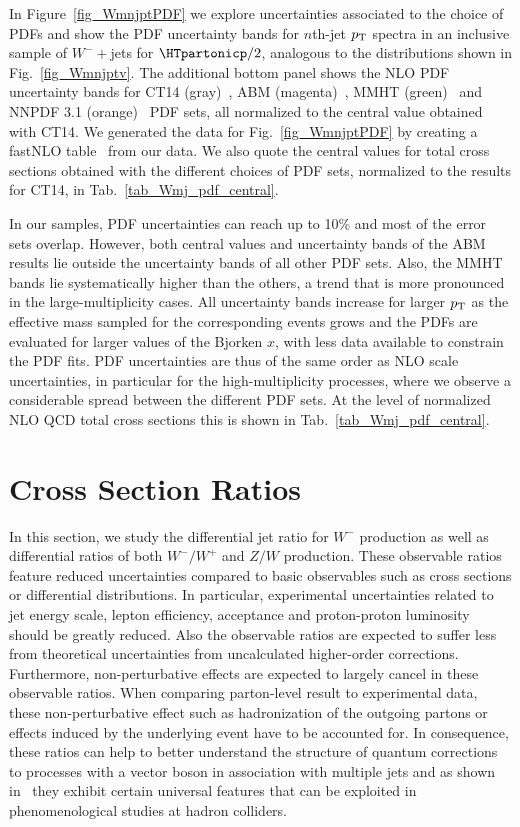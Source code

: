 In Figure~\ref{fig_WmnjptPDF} we explore uncertainties associated to
the choice of PDFs and show the PDF uncertainty bands for $n$th-jet $p_{\textrm T}$ spectra
in an inclusive sample of $W^-+$jets for $\HTpartonicp/2$, analogous to the distributions shown in
Fig.~\ref{fig_Wmnjptv}. The additional bottom panel shows the NLO PDF uncertainty
bands for CT14 (gray)~\cite{CT14}, ABM (magenta)~\cite{ABM}, MMHT
(green)~\cite{MMHT} and
NNPDF 3.1 (orange)~\cite{NNPDF} PDF
sets, all normalized to the central value obtained with CT14. 
We generated the data for Fig.~\ref{fig_WmnjptPDF} by
creating a fastNLO table~\cite{Britzger:2012bs} from our \ntuple{} data. We also quote the
central values for total cross sections obtained with the different
choices of PDF sets, normalized to the results for CT14, in Tab.~\ref{tab_Wmj_pdf_central}.


In our samples, PDF uncertainties can reach up to 10\% and most of the error sets
overlap. However, both central values and uncertainty bands of the ABM
results lie outside the uncertainty bands of all other PDF sets. Also, the MMHT bands
lie systematically higher than the others, a trend that is more pronounced in the
large-multiplicity cases. All uncertainty bands increase for larger
$p_{\textrm T}$ as the effective mass sampled for the corresponding
events grows and the PDFs are evaluated for larger values of the Bjorken $x$, with less data available to constrain the PDF
fits. PDF uncertainties are thus of the same order as NLO scale
uncertainties, in particular for the high-multiplicity processes,
where we observe a considerable spread between the different PDF sets. At the
level of normalized NLO QCD total cross sections this is shown in
Tab.~\ref{tab_Wmj_pdf_central}.


\section{Cross Section Ratios}
\label{sec_ratios}

In this
section, we study the differential jet ratio for $W^-$ production as
well as differential ratios of both $W^-/W^+$ and $Z/W$
production. These observable ratios feature reduced uncertainties compared to
basic observables such as cross sections or differential
distributions. In particular, experimental uncertainties related to jet energy
scale, lepton efficiency, acceptance and proton-proton luminosity should be
greatly reduced. Also the observable ratios are expected to suffer less from theoretical
uncertainties from uncalculated higher-order corrections. Furthermore, non-perturbative effects are expected to largely cancel in these observable ratios. When comparing parton-level result to experimental data, these non-perturbative effect such as hadronization of the outgoing partons or effects induced by the underlying event have to be accounted for. In consequence, these ratios can help to better understand the structure of quantum corrections to
processes with a vector boson in association with multiple jets and as shown
in~\cite{BH:Wratios} they exhibit certain universal features that
can be exploited in phenomenological studies at hadron colliders. 


